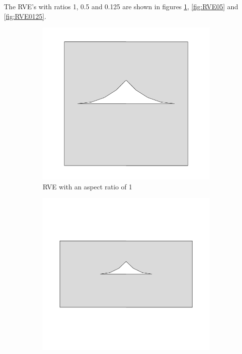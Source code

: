 The RVE's with ratios 1, 0.5 and 0.125 are shown in figures \ref{fig:RVE1}, \ref{fig:RVE05} and \ref{fig:RVE0125}.
\begin{figure}
    \centering
\begin{subfigure}[b]{0.3\textwidth}
    \includegraphics[width=\textwidth]{chapter_4_RVE_Definition/figures/1clean.png}
    \caption{RVE with an aspect ratio of 1}
    \label{fig:RVE1}
\end{subfigure}
%
\begin{subfigure}[b]{0.3\textwidth}
    \includegraphics[width=\textwidth]{chapter_4_RVE_Definition/figures/05clean.png}

\end{subfigure}
\end{figure}
